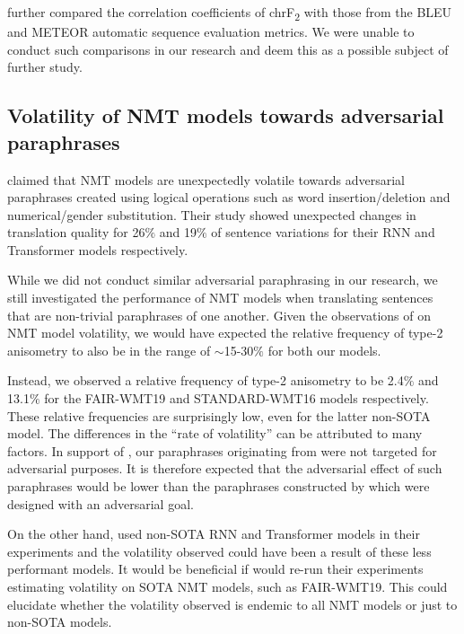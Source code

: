 \documentclass[11pt,a4paper]{article}
\begin{document}
\citet{michel2019evaluation} further compared the correlation coefficients of
chrF\textsubscript{2} with those from the BLEU \cite{papineni2002bleu} and
METEOR \cite{denkowski2014meteor} automatic sequence evaluation metrics. We were
unable to conduct such comparisons in our research and deem this as a possible
subject of further study.

\subsection{Volatility of NMT models towards adversarial paraphrases}

\citet{fadaee2020unreasonable} claimed that NMT models are unexpectedly volatile
towards adversarial paraphrases created using logical operations such as word
insertion/deletion and numerical/gender substitution. Their study showed
unexpected changes in translation quality for 26$\%$ and 19$\%$ of sentence
variations for their RNN and Transformer models respectively.

While we did not conduct similar adversarial paraphrasing in our research, we
still investigated the performance of NMT models when translating sentences that
are non-trivial paraphrases of one another. Given the observations of
\citet{fadaee2020unreasonable} on NMT model volatility, we would have expected
the relative frequency of type-2 anisometry to also be in the range of
$\sim$15-30$\%$ for both our models.

Instead, we observed a relative frequency of type-2 anisometry to be 2.4$\%$ and
13.1$\%$ for the FAIR-WMT19 and STANDARD-WMT16 models respectively. These relative
frequencies are surprisingly low, even for the latter non-SOTA model. The
differences in the ``rate of volatility'' can be attributed to many factors. In
support of \citet{fadaee2020unreasonable}, our paraphrases originating from
\citet{freitag-bleu-paraphrase-references-2020} were not targeted for
adversarial purposes. It is therefore expected that the adversarial effect of
such paraphrases would be lower than the paraphrases constructed by
\citet{fadaee2020unreasonable} which were designed with an adversarial goal.

On the other hand, \citet{fadaee2020unreasonable} used non-SOTA RNN and
Transformer models in their experiments and the volatility observed could have
been a result of these less performant models. It would be beneficial if
\citet{fadaee2020unreasonable} would re-run their experiments estimating
volatility on SOTA NMT models, such as FAIR-WMT19. This could elucidate whether
the volatility observed is endemic to all NMT models or just to non-SOTA models.
\end{document}
